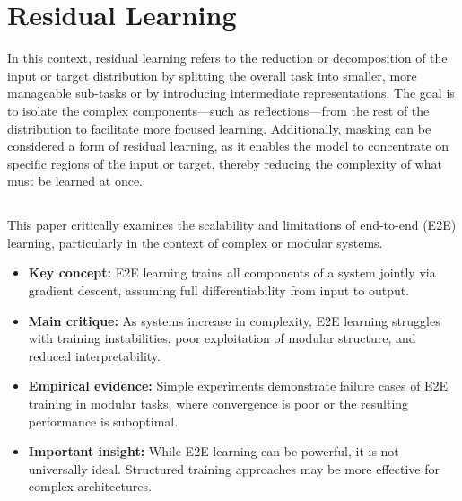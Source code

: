 	\section{Residual Learning}  %
	\label{sec:lit-complex-focus-only}
		In this context, residual learning refers to the reduction or decomposition of the input or target distribution by splitting the overall task into smaller, more manageable sub-tasks or by introducing intermediate representations. The goal is to isolate the complex components—such as reflections—from the rest of the distribution to facilitate more focused learning. Additionally, masking can be considered a form of residual learning, as it enables the model to concentrate on specific regions of the input or target, thereby reducing the complexity of what must be learned at once.
	
		\subsection{}
			This paper critically examines the scalability and limitations of end-to-end (E2E) learning, particularly in the context of complex or modular systems.
			
			\begin{itemize}[itemsep=1mm, parsep=0pt]
				\item \textbf{Key concept:} E2E learning trains all components of a system jointly via gradient descent, assuming full differentiability from input to output.
				\item \textbf{Main critique:} As systems increase in complexity, E2E learning struggles with training instabilities, poor exploitation of modular structure, and reduced interpretability.
				\item \textbf{Empirical evidence:} Simple experiments demonstrate failure cases of E2E training in modular tasks, where convergence is poor or the resulting performance is suboptimal.
				\item \textbf{Important insight:} While E2E learning can be powerful, it is not universally ideal. Structured training approaches may be more effective for complex architectures.
			\end{itemize}
			
